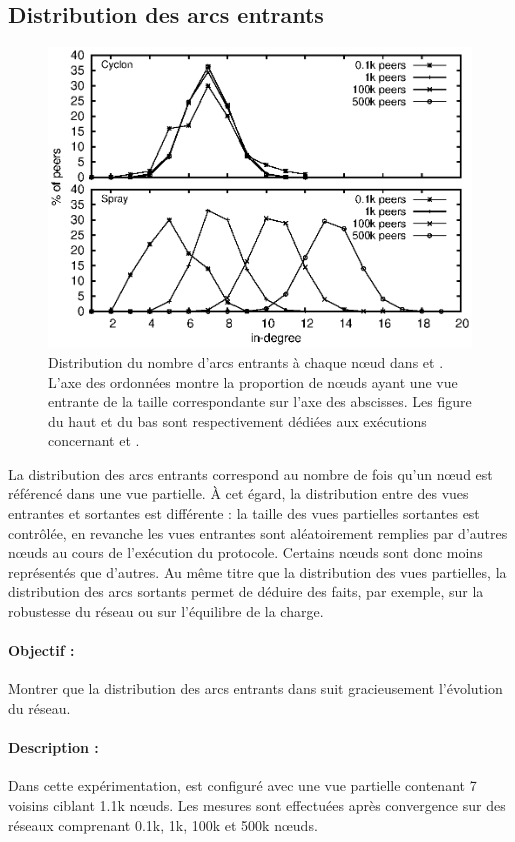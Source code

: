 \subsection{Distribution des arcs entrants}
\label{net:subsec:inview}

\begin{figure}
  \centering
  \includegraphics[width=.8\textwidth]{img/spray/histo.eps}
  \caption[Distribution du nombre d'arcs entrants]{\label{net:fig:inview} Distribution
    du nombre d'arcs entrants à chaque nœud dans \CYCLON et \SPRAY. L'axe des
    ordonnées montre la proportion de nœuds ayant une vue entrante de la taille
    correspondante sur l'axe des abscisses. Les figure du haut et du bas sont
    respectivement dédiées aux exécutions concernant \CYCLON et \SPRAY.}
\end{figure}

La distribution des arcs entrants correspond au nombre de fois qu'un nœud est
référencé dans une vue partielle. À cet égard, la distribution entre des vues
entrantes et sortantes est différente : la taille des vues partielles sortantes
est contrôlée, en revanche les vues entrantes sont aléatoirement remplies par
d'autres nœuds au cours de l'exécution du protocole. Certains nœuds sont donc
moins représentés que d'autres.  Au même titre que la distribution des vues
partielles, la distribution des arcs sortants permet de déduire des faits, par
exemple, sur la robustesse du réseau ou sur l'équilibre de la charge.

\paragraph{Objectif :} Montrer que la distribution des arcs entrants dans \SPRAY
suit gracieusement l'évolution du réseau.

\paragraph{Description :} Dans cette expérimentation, \CYCLON est configuré avec
une vue partielle contenant 7 voisins ciblant 1.1k nœuds. Les mesures sont
effectuées après convergence sur des réseaux comprenant 0.1k, 1k, 100k et 500k
nœuds.

